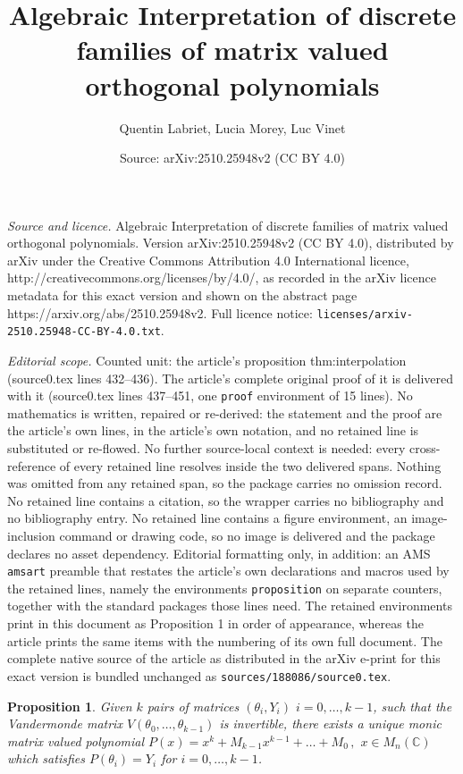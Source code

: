\documentclass[10pt,a4paper]{amsart}
\title{Algebraic Interpretation of discrete families of matrix valued orthogonal polynomials}
\author{Quentin Labriet, Lucia Morey, Luc Vinet}
\date{Source: arXiv:2510.25948v2 (CC BY 4.0)}
\newtheorem{proposition}{Proposition}
\begin{document}
\maketitle

\noindent\emph{Source and licence.} Algebraic Interpretation of discrete families of matrix valued orthogonal polynomials. Version arXiv:2510.25948v2 (CC BY 4.0), distributed by arXiv under the Creative Commons Attribution 4.0 International licence, http://creativecommons.org/licenses/by/4.0/, as recorded in the arXiv licence metadata for this exact version and shown on the abstract page https://arxiv.org/abs/2510.25948v2. Full licence notice: \texttt{licenses/arxiv-2510.25948-CC-BY-4.0.txt}.\par\smallskip

\noindent\textit{Editorial scope.} Counted unit: the article's proposition thm:interpolation (source0.tex lines 432--436). The article's complete original proof of it is delivered with it (source0.tex lines 437--451, one \texttt{proof} environment of 15 lines). No mathematics is written, repaired or re-derived: the statement and the proof are the article's own lines, in the article's own notation, and no retained line is substituted or re-flowed.  No further source-local context is needed: every cross-reference of every retained line resolves inside the two delivered spans.  Nothing was omitted from any retained span, so the package carries no omission record.  No retained line contains a citation, so the wrapper carries no bibliography and no bibliography entry.  No retained line contains a figure environment, an image-inclusion command or drawing code, so no image is delivered and the package declares no asset dependency.  Editorial formatting only, in addition: an AMS \texttt{amsart} preamble that restates the article's own declarations and macros used by the retained lines, namely the environments \texttt{proposition} on separate counters, together with the standard packages those lines need.  The retained environments print in this document as Proposition 1 in order of appearance, whereas the article prints the same items with the numbering of its own full document.  The complete native source of the article as distributed in the arXiv e-print for this exact version is bundled unchanged as \texttt{sources/188086/source0.tex}.
\begin{proposition}
\label{thm:interpolation}
Given $k$ pairs of matrices $(\theta_i,Y_i)$ $i=0,\ldots,k-1$, such that the Vandermonde matrix $V(\theta_0,\ldots,\theta_{k-1})$ is invertible, there exists a unique monic matrix valued polynomial $P(x)=x^{k}+M_{k-1} x^{k-1}+\ldots+M_0\,,$ $x\in M_n(\mathbb{C})$
which satisfies $P(\theta_i)=Y_i$ for $i=0,\ldots,k-1$.
\end{proposition}
\end{document}
